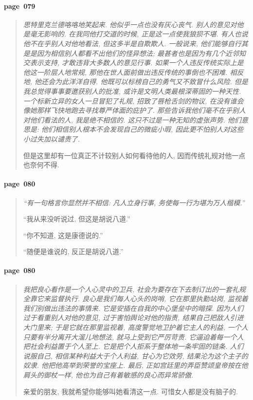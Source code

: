 \paragraph*{page~079}
\begin{quotation}
    \itshape
    思特里克兰德咯咯地笑起来. 他似乎一点也没有灰心丧气. 别人的意见对他是毫无影响的. 在我同他打交道的时候, 正是这一点使我狼狈不堪. 有人也说他不在乎别人对他地看法, 但这多半是自欺欺人. 一般说来, 他们能够自行其是是因为相信别人都看不出他们的怪异想法; 最甚者也是因为有几个近邻知交表示支持, 才敢违背大多数人的意见行事. 如果一个人违反传统实际上是他这一阶层人地常规, 那他在世人面前做出违反传统的事倒也不困难. 相反地, 他还会为此洋洋自得. 他既可以标榜自己的勇气又不致冒什么风险. 但是我总觉得事事要邀获别人的批准, 或许是文明人类最根深蒂固的一种天性. 一个标新立异的女人一旦冒犯了礼规, 招致了唇枪舌剑的物议, 在没有谁会像她那样飞快地跑去寻找尊严体面的庇护了. 那些告诉我他们毫不在乎别人对他们看法的人, 我是绝不相信的. 这只不过是一种无知的虚张声势. 他们意思是: 他们相信别人根本不会发现自己的微疵小瑕, 因此更不怕别人对这些小过失加以谴责了. 

    但是这里却有一位真正不计较别人如何看待他的人, 因而传统礼规对他一点也奈何不得. 
\end{quotation}

\paragraph*{page~080}
\begin{quotation}
    \itshape
    ``有一句格言你显然并不相信: 凡人立身行事, 务使每一行为堪为万人楷模.''

    ``我从来没听说过, 但这是胡说八道.''

    ``你不知道, 这是康德说的.''

    ``随便是谁说的, 反正是胡说八道.''
\end{quotation}

\paragraph*{page~080}
\begin{quotation}
    \itshape
    我把良心看作是一个人心灵中的卫兵, 社会为要存在下去制订出的一套礼规全靠它来监督执行. 良心是我们每人心头的岗哨, 它在那里执勤站岗, 监视着我们别做出违法的事情来. 它是安插在自我的中心堡垒中的暗探. 因为人们过于看重别人对他的意见, 过于害怕舆论对他的指责, 结果自己把敌人引进大门里来; 于是它就在那里监视着, 高度警觉地卫护着它主人的利益, 一个人只要有半分离开大溜儿地想法, 就马上受到它严厉苛责. 它逼迫着每一个人把社会利益置于个人至上. 它是把个人拒系于整体地一条牢固的链条. 人们说服自己, 相信某种利益大于个人利益, 甘心为它效劳, 结果沦为这个主子的奴隶. 他把他高举到荣誉的宝座上. 最后, 正如宫廷里的弄臣赞颂皇帝按在他肩头的御杖一样, 他也为自己有着敏感的良心而异常骄傲.

    亲爱的朋友, 我就希望你能够叫她看清这一点. 可惜女人都是没有脑子的. 
\end{quotation}

